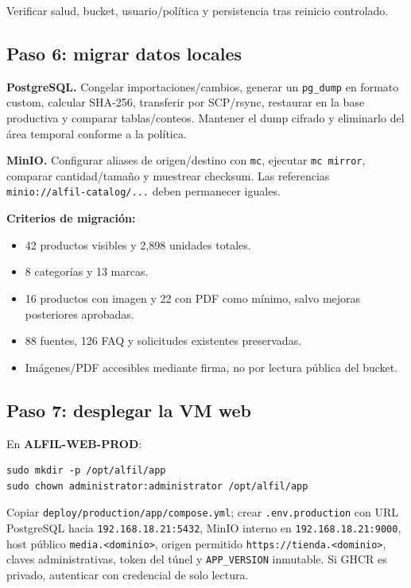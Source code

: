 \documentclass[11pt,a4paper]{article}
\newcommand{\code}[1]{\nolinkurl{#1}}
\begin{document}
Verificar salud, bucket, usuario/política y persistencia tras reinicio controlado.

\subsection{Paso 6: migrar datos locales}

\textbf{PostgreSQL.} Congelar importaciones/cambios, generar un \code{pg_dump} en formato custom, calcular SHA-256, transferir por SCP/rsync, restaurar en la base productiva y comparar tablas/conteos. Mantener el dump cifrado y eliminarlo del área temporal conforme a la política.

\textbf{MinIO.} Configurar aliases de origen/destino con \code{mc}, ejecutar \code{mc mirror}, comparar cantidad/tamaño y muestrear checksum. Las referencias \code{minio://alfil-catalog/...} deben permanecer iguales.

\textbf{Criterios de migración:}
\begin{itemize}
  \item 42 productos visibles y 2,898 unidades totales.
  \item 8 categorías y 13 marcas.
  \item 16 productos con imagen y 22 con PDF como mínimo, salvo mejoras posteriores aprobadas.
  \item 88 fuentes, 126 FAQ y solicitudes existentes preservadas.
  \item Imágenes/PDF accesibles mediante firma, no por lectura pública del bucket.
\end{itemize}

\subsection{Paso 7: desplegar la VM web}

En \textbf{ALFIL-WEB-PROD}:

\begin{lstlisting}
sudo mkdir -p /opt/alfil/app
sudo chown administrator:administrator /opt/alfil/app
\end{lstlisting}

Copiar \code{deploy/production/app/compose.yml}; crear \code{.env.production} con URL PostgreSQL hacia \code{192.168.18.21:5432}, MinIO interno en \code{192.168.18.21:9000}, host público \code{media.<dominio>}, origen permitido \code{https://tienda.<dominio>}, claves administrativas, token del túnel y \code{APP_VERSION} inmutable. Si GHCR es privado, autenticar con credencial de solo lectura.
\end{document}
